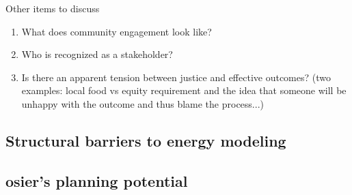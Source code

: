 Other items to discuss
\begin{enumerate}
    \item What does community engagement look like?
    \item Who is recognized as a stakeholder?
    \item Is there an apparent tension between justice and effective outcomes?
    (two examples: local food vs equity requirement and the idea that someone
    will be unhappy with the outcome and thus blame the process...)
\end{enumerate}


\subsection{Structural barriers to energy modeling}

\subsection{\ac{osier}'s planning potential}






